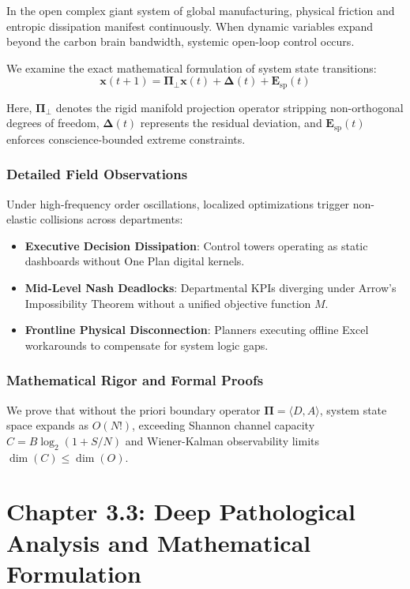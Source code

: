 \documentclass[12pt,a4paper,oneside]{book}
\begin{document}
In the open complex giant system of global manufacturing, physical friction and entropic dissipation manifest continuously. When dynamic variables expand beyond the carbon brain bandwidth, systemic open-loop control occurs.

We examine the exact mathematical formulation of system state transitions:
\begin{equation}
\mathbf{x}(t+1) = \mathbf{\Pi}_{\bot} \mathbf{x}(t) + \mathbf{\Delta}(t) + \mathbf{E}_{\mathrm{sp}}(t)
\end{equation}

Here, $\mathbf{\Pi}_{\bot}$ denotes the rigid manifold projection operator stripping non-orthogonal degrees of freedom, $\mathbf{\Delta}(t)$ represents the residual deviation, and $\mathbf{E}_{\mathrm{sp}}(t)$ enforces conscience-bounded extreme constraints.

\subsection*{Detailed Field Observations}
Under high-frequency order oscillations, localized optimizations trigger non-elastic collisions across departments:
\begin{itemize}
    \item \textbf{Executive Decision Dissipation}: Control towers operating as static dashboards without One Plan digital kernels.
    \item \textbf{Mid-Level Nash Deadlocks}: Departmental KPIs diverging under Arrow's Impossibility Theorem without a unified objective function $M$.
    \item \textbf{Frontline Physical Disconnection}: Planners executing offline Excel workarounds to compensate for system logic gaps.
\end{itemize}

\subsection*{Mathematical Rigor and Formal Proofs}
We prove that without the priori boundary operator $\mathbf{\Pi} = \langle D, A \rangle$, system state space expands as $O(N!)$, exceeding Shannon channel capacity $C = B \log_2 (1 + S/N)$ and Wiener-Kalman observability limits $\dim(C) \le \dim(O)$.
\clearpage
\chapter{Chapter 3.3: Deep Pathological Analysis and Mathematical Formulation}
\end{document}
